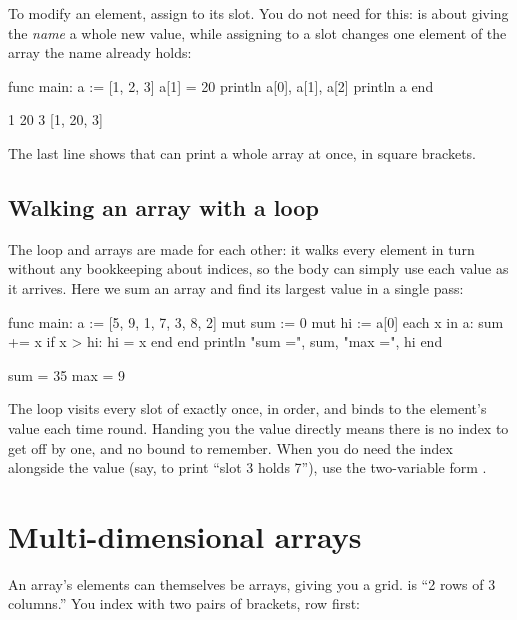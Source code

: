 To modify an element, assign to its slot. You do not need  for this:
 is about giving the \emph{name} a whole new value, while assigning to
a slot changes one element of the array the name already holds:

\begin{salamen}
func main:
    a := [1, 2, 3]
    a[1] = 20
    println a[0], a[1], a[2]
    println a
end
\end{salamen}

\begin{progout}
1 20 3
[1, 20, 3]
\end{progout}

The last line shows that  can print a whole array at once, in
square brackets.

\subsection{Walking an array with a loop}

The  loop and arrays are made for each other: it walks every element
in turn without any bookkeeping about indices, so the body can simply use each
value as it arrives. Here we sum an array and find its largest value in a single
pass:

\begin{salamen}
func main:
    a := [5, 9, 1, 7, 3, 8, 2]
    mut sum := 0
    mut hi := a[0]
    each x in a:
        sum += x
        if x > hi: hi = x end
    end
    println "sum =", sum, "max =", hi
end
\end{salamen}

\begin{progout}
sum = 35 max = 9
\end{progout}

The  loop visits every slot of  exactly once, in order, and
binds  to the element's value each time round. Handing you the value
directly means there is no index to get off by one, and no bound to remember.
When you do need the index alongside the value (say, to print ``slot 3 holds
7''), use the two-variable form .

\section{Multi-dimensional arrays}

An array's elements can themselves be arrays, giving you a grid. 
is ``2 rows of 3 columns.'' You index with two pairs of brackets, row first:

